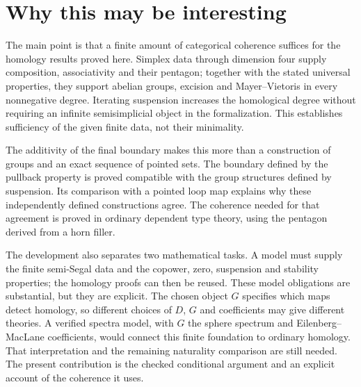 \documentclass[11pt]{amsart}
\begin{document}
\section{Why this may be interesting}
The main point is that a finite amount of categorical coherence suffices
for the homology results proved here. Simplex data through dimension
four supply composition, associativity and their pentagon; together
with the stated universal properties, they support abelian groups,
excision and Mayer--Vietoris in every nonnegative degree. Iterating
suspension increases the homological degree without requiring an
infinite semisimplicial object in the formalization. This establishes
sufficiency of the given finite data, not their minimality.

The additivity of the final boundary makes this more than a construction
of groups and an exact sequence of pointed sets. The boundary defined
by the pullback property is proved compatible with the group structures
defined by suspension. Its comparison with a pointed loop map explains
why these independently defined constructions agree. The coherence
needed for that agreement is proved in ordinary dependent type theory,
using the pentagon derived from a horn filler.

The development also separates two mathematical tasks. A model must
supply the finite semi-Segal data and the copower, zero, suspension and
stability properties; the homology proofs can then be reused. These
model obligations are substantial, but they are explicit. The chosen
object $G$ specifies which maps detect homology, so different choices
of $D$, $G$ and coefficients may give different theories. A verified
spectra model, with $G$ the sphere spectrum and Eilenberg--MacLane
coefficients, would connect this finite foundation to ordinary homology.
That interpretation and the remaining naturality comparison are still
needed. The present contribution is the checked conditional argument
and an explicit account of the coherence it uses.
\end{document}
